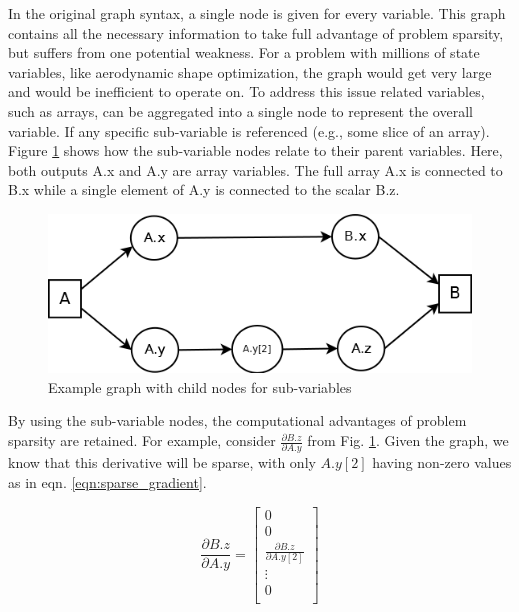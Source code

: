 \documentclass[]{aiaa-tc} %
\begin{document}
    In the original graph syntax, a single node is given for every variable. This graph contains all the
    necessary information to take full advantage of problem sparsity, but suffers from one potential
    weakness. For a problem with millions of state variables, like aerodynamic shape optimization,
    the graph would get very large and would be inefficient to operate on. To address this issue
    related variables, such as arrays, can be aggregated into a single node to represent the
    overall variable. If any specific sub-variable is referenced (e.g., some slice of an array).
    Figure \ref{fig:subvars} shows how the sub-variable nodes relate to their parent variables. Here,
    both outputs A.x and A.y are array variables. The full array A.x is connected to
    B.x while a single element of A.y is connected to the scalar B.z.

    \begin{figure}[!htb]\begin{center}
      \includegraphics[width=.8\textwidth]{images/Graph1}
      \caption{ Example graph with child nodes for sub-variables \label{fig:subvars}}
    \end{center}\end{figure}

    By using the sub-variable nodes, the computational advantages of problem sparsity are retained. For example,
    consider $\frac{\partial B.z}{\partial A.y}$ from Fig. \ref{fig:subvars}. Given the graph, we know that
    this derivative will be sparse, with only $A.y[2]$ having non-zero values as in eqn.  \ref{eqn:sparse_gradient}.

    \begin{equation}
        \frac{\partial B.z}{\partial A.y} =
        \begin{bmatrix}
            0 \\
            0 \\
            \frac{\partial B.z}{\partial A.y[2]} \\
            \vdots \\
            0 \\
        \end{bmatrix}
        \label{eqn:sparse_gradient}
    \end{equation}
\end{document}
